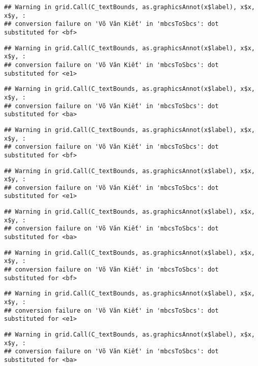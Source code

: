 \documentclass[
]{article}
\begin{document}
\begin{verbatim}
## Warning in grid.Call(C_textBounds, as.graphicsAnnot(x$label), x$x, x$y, :
## conversion failure on 'Võ Văn Kiết' in 'mbcsToSbcs': dot substituted for <bf>
\end{verbatim}

\begin{verbatim}
## Warning in grid.Call(C_textBounds, as.graphicsAnnot(x$label), x$x, x$y, :
## conversion failure on 'Võ Văn Kiết' in 'mbcsToSbcs': dot substituted for <e1>
\end{verbatim}

\begin{verbatim}
## Warning in grid.Call(C_textBounds, as.graphicsAnnot(x$label), x$x, x$y, :
## conversion failure on 'Võ Văn Kiết' in 'mbcsToSbcs': dot substituted for <ba>
\end{verbatim}

\begin{verbatim}
## Warning in grid.Call(C_textBounds, as.graphicsAnnot(x$label), x$x, x$y, :
## conversion failure on 'Võ Văn Kiết' in 'mbcsToSbcs': dot substituted for <bf>
\end{verbatim}

\begin{verbatim}
## Warning in grid.Call(C_textBounds, as.graphicsAnnot(x$label), x$x, x$y, :
## conversion failure on 'Võ Văn Kiết' in 'mbcsToSbcs': dot substituted for <e1>
\end{verbatim}

\begin{verbatim}
## Warning in grid.Call(C_textBounds, as.graphicsAnnot(x$label), x$x, x$y, :
## conversion failure on 'Võ Văn Kiết' in 'mbcsToSbcs': dot substituted for <ba>
\end{verbatim}

\begin{verbatim}
## Warning in grid.Call(C_textBounds, as.graphicsAnnot(x$label), x$x, x$y, :
## conversion failure on 'Võ Văn Kiết' in 'mbcsToSbcs': dot substituted for <bf>
\end{verbatim}

\begin{verbatim}
## Warning in grid.Call(C_textBounds, as.graphicsAnnot(x$label), x$x, x$y, :
## conversion failure on 'Võ Văn Kiết' in 'mbcsToSbcs': dot substituted for <e1>
\end{verbatim}

\begin{verbatim}
## Warning in grid.Call(C_textBounds, as.graphicsAnnot(x$label), x$x, x$y, :
## conversion failure on 'Võ Văn Kiết' in 'mbcsToSbcs': dot substituted for <ba>
\end{verbatim}
\end{document}
